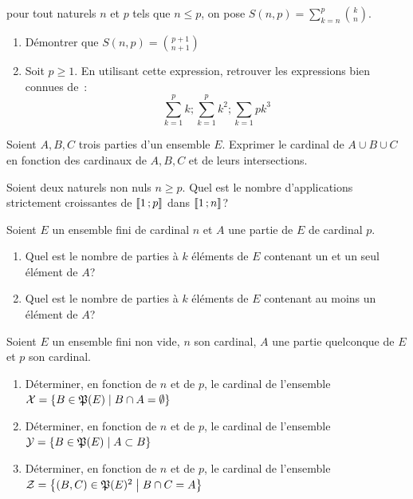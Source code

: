 \begin{exercice}
  pour tout naturels \(n\) et \(p\) tels que \(n \leqslant p\), on pose \(S(n, 
  p) = \sum_{k = n}^p \binom{k}{n}\).
  \begin{enumerate}
    \item Démontrer que \(S(n, p) = \binom{p + 1}{n + 1}\)
    \item Soit \(p \geqslant 1\). En utilisant cette expression, retrouver les 
      expressions bien connues de~: \[\sum_{k = 1}^p k ; \sum_{k = 1}^p k^2 ; 
      \sum_{k = 1}{p} k^3\]
  \end{enumerate}
\end{exercice}

\begin{exercice}
  Soient \(A, B, C\) trois parties d'un ensemble \(E\). Exprimer le cardinal de 
  \(A \cup B \cup C\) en fonction des cardinaux de \(A, B, C\) et de leurs 
  intersections.
\end{exercice}

\begin{exercice}
  Soient deux naturels non nuls \(n\geqslant p\). Quel est le nombre 
  d'applications strictement croissantes de \(\mathopen{\llbracket}1\mathclose{}\mathpunct{};p\mathclose{\rrbracket}\) dans 
  \(\mathopen{\llbracket}1\mathclose{}\mathpunct{};n\mathclose{\rrbracket}\)?
\end{exercice}

\begin{exercice}
  Soient \(E\) un ensemble fini de cardinal \(n\) et \(A\) une partie de \(E\) 
  de cardinal \(p\).
  \begin{enumerate}
    \item Quel est le nombre de parties à \(k\) éléments de \(E\) contenant un 
      et un seul élément de \(A\)?
    \item Quel est le nombre de parties à \(k\) éléments de \(E\) contenant au 
      moins un  élément de \(A\)?
  \end{enumerate}
\end{exercice}

\begin{exercice}
  Soient \(E\) un ensemble fini non vide, \(n\) son cardinal, \(A\) une partie 
  quelconque de \(E\) et \(p\) son cardinal.
  \begin{enumerate}
    \item Déterminer, en fonction de \(n\) et de \(p\), le cardinal de 
      l'ensemble \(\mathcal{X} = \left\{B \in \mathfrak{P}(E)\mathrel{}\middle|\mathrel{}B \cap A = \emptyset\right\}\)
    \item Déterminer, en fonction de \(n\) et de \(p\), le cardinal de 
      l'ensemble \(\mathcal{Y} = \left\{B \in \mathfrak{P}(E)\mathrel{}\middle|\mathrel{}A \subset B\right\}\)
    \item Déterminer, en fonction de \(n\) et de \(p\), le cardinal de 
      l'ensemble \(\mathcal{Z} = \left\{(B, C) \in \mathfrak{P}(E)^2\mathrel{}\middle|\mathrel{}B \cap C = A\right\}\)
  \end{enumerate}
\end{exercice}
